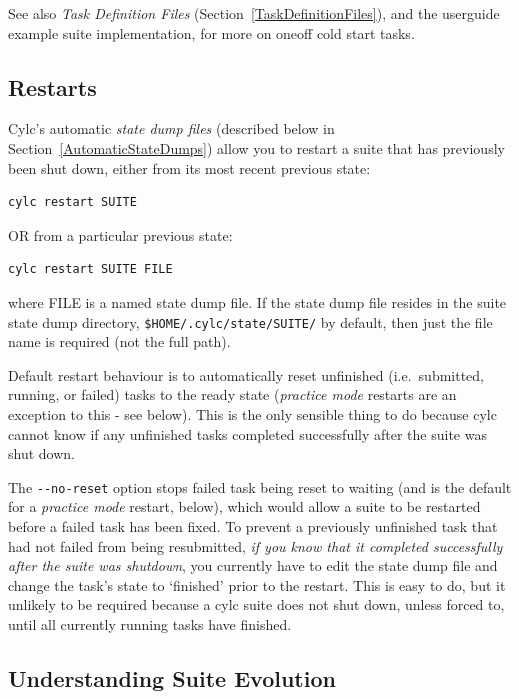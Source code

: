 \documentclass[11pt,a4paper]{article}
\begin{document}
See also {\em Task Definition Files}
(Section~\ref{TaskDefinitionFiles}), and the userguide example suite
implementation, for more on oneoff cold start tasks.

\subsection{Restarts}
\label{Restarts}

Cylc's automatic {\em state dump files} (described below in
Section~\ref{AutomaticStateDumps}) allow you to restart a suite
that has previously been shut down, either from 
its most recent previous state:

\begin{lstlisting}
cylc restart SUITE
\end{lstlisting}

OR from a particular previous state:

\begin{lstlisting}
cylc restart SUITE FILE
\end{lstlisting}

where FILE is a named state dump file. If the state dump file resides in
the suite state dump directory,  
\lstinline=$HOME/.cylc/state/SUITE/= by default, then just the file
name is required (not the full path).

Default restart behaviour is to automatically reset unfinished (i.e.\
submitted, running, or failed) tasks to the ready state ({\em practice
mode} restarts are an exception to this - see below).  This is the only
sensible thing to do because cylc cannot know if any unfinished tasks
completed successfully after the suite was shut down.  

The \lstinline=--no-reset= option stops failed task being reset to 
waiting (and is the default for a {\em practice mode} restart, below), 
which would allow a suite to be restarted before a failed task has been
fixed. To prevent a previously unfinished task that had not failed from
being resubmitted, {\em if you know that it completed successfully after
the suite was shutdown}, you currently have to edit the state dump file
and change the task's state to `finished' prior to the restart. This is
easy to do, but it unlikely to be required because a cylc suite does
not shut down, unless forced to, until all currently running tasks have
finished.


\subsection{Understanding Suite Evolution}
\label{UnderstandingSuiteEvolution}
\end{document}
